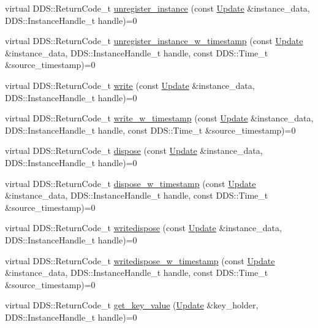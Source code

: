 \begin{DoxyCompactItemize}
\item 
virtual DDS::ReturnCode\_\-t \hyperlink{classKnowledge_1_1UpdateDataWriter_a286e61c2e14474e06986af6ace016658}{unregister\_\-instance} (const \hyperlink{structKnowledge_1_1Update}{Update} \&instance\_\-data, DDS::InstanceHandle\_\-t handle)=0
\item 
virtual DDS::ReturnCode\_\-t \hyperlink{classKnowledge_1_1UpdateDataWriter_a93c8b276b05a8a3de052ad86871e0419}{unregister\_\-instance\_\-w\_\-timestamp} (const \hyperlink{structKnowledge_1_1Update}{Update} \&instance\_\-data, DDS::InstanceHandle\_\-t handle, const DDS::Time\_\-t \&source\_\-timestamp)=0
\item 
virtual DDS::ReturnCode\_\-t \hyperlink{classKnowledge_1_1UpdateDataWriter_aa370a8db4ea1354211f84ce4c0fb159d}{write} (const \hyperlink{structKnowledge_1_1Update}{Update} \&instance\_\-data, DDS::InstanceHandle\_\-t handle)=0
\item 
virtual DDS::ReturnCode\_\-t \hyperlink{classKnowledge_1_1UpdateDataWriter_abcb9ff3935c85cbabdaf9d4550920918}{write\_\-w\_\-timestamp} (const \hyperlink{structKnowledge_1_1Update}{Update} \&instance\_\-data, DDS::InstanceHandle\_\-t handle, const DDS::Time\_\-t \&source\_\-timestamp)=0
\item 
virtual DDS::ReturnCode\_\-t \hyperlink{classKnowledge_1_1UpdateDataWriter_a41a5361c709d4f8cf005d88522358aba}{dispose} (const \hyperlink{structKnowledge_1_1Update}{Update} \&instance\_\-data, DDS::InstanceHandle\_\-t handle)=0
\item 
virtual DDS::ReturnCode\_\-t \hyperlink{classKnowledge_1_1UpdateDataWriter_a50d362b09b20074aeabc09d38f7b0c48}{dispose\_\-w\_\-timestamp} (const \hyperlink{structKnowledge_1_1Update}{Update} \&instance\_\-data, DDS::InstanceHandle\_\-t handle, const DDS::Time\_\-t \&source\_\-timestamp)=0
\item 
virtual DDS::ReturnCode\_\-t \hyperlink{classKnowledge_1_1UpdateDataWriter_a6e218acc41814ce89ffe15853ce38793}{writedispose} (const \hyperlink{structKnowledge_1_1Update}{Update} \&instance\_\-data, DDS::InstanceHandle\_\-t handle)=0
\item 
virtual DDS::ReturnCode\_\-t \hyperlink{classKnowledge_1_1UpdateDataWriter_afe1c5a5855bd28307ae2d7c290e80166}{writedispose\_\-w\_\-timestamp} (const \hyperlink{structKnowledge_1_1Update}{Update} \&instance\_\-data, DDS::InstanceHandle\_\-t handle, const DDS::Time\_\-t \&source\_\-timestamp)=0
\item 
virtual DDS::ReturnCode\_\-t \hyperlink{classKnowledge_1_1UpdateDataWriter_a917b2cbb12d7cae6728d5c967a1f8b31}{get\_\-key\_\-value} (\hyperlink{structKnowledge_1_1Update}{Update} \&key\_\-holder, DDS::InstanceHandle\_\-t handle)=0
\end{DoxyCompactItemize}
